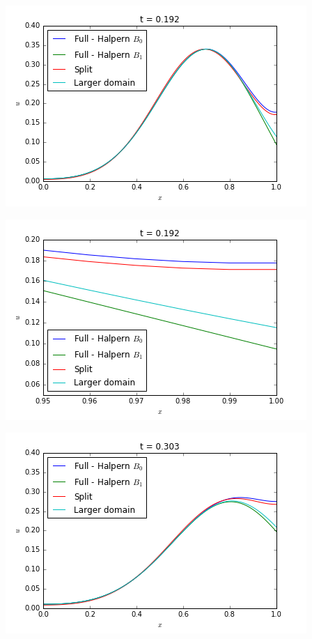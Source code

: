 \noindent\begin{minipage}{\textwidth} 
	\begin{minipage}{.5\textwidth} 
		\includegraphics[scale=.48]{figures/firstCase1.png}	
	\end{minipage}
	\begin{minipage}{.5\linewidth}
		\includegraphics[scale=.48]{figures/firstCase1Detail.png}	
	\end{minipage}
	\begin{minipage}{.5\textwidth} 
		\includegraphics[scale=.48]{figures/firstCase2.png}	

\end{minipage}
\end{minipage}

